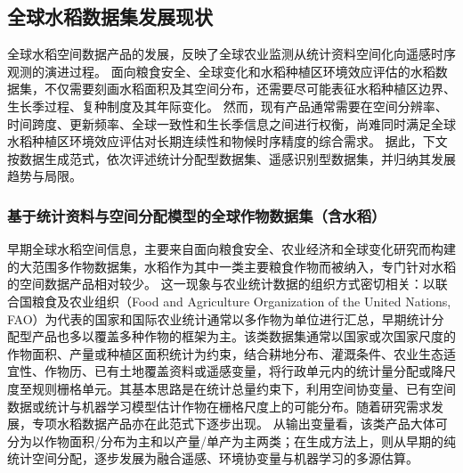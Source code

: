 \subsection{全球水稻数据集发展现状}

全球水稻空间数据产品的发展，反映了全球农业监测从统计资料空间化向遥感时序观测的演进过程。
面向粮食安全、全球变化和水稻种植区环境效应评估的水稻数据集，不仅需要刻画水稻面积及其空间分布，还需要尽可能表征水稻种植区边界、生长季过程、复种制度及其年际变化。
然而，现有产品通常需要在空间分辨率、时间跨度、更新频率、全球一致性和生长季信息之间进行权衡，尚难同时满足全球水稻种植区环境效应评估对长期连续性和物候时序精度的综合需求\cite{Dong2016,Fritz2019,Fang2024Review}。
据此，下文按数据生成范式，依次评述统计分配型数据集、遥感识别型数据集，并归纳其发展趋势与局限。

\subsubsection{基于统计资料与空间分配模型的全球作物数据集（含水稻）}

早期全球水稻空间信息，主要来自面向粮食安全、农业经济和全球变化研究而构建的大范围多作物数据集，水稻作为其中一类主要粮食作物而被纳入，专门针对水稻的空间数据产品相对较少。
这一现象与农业统计数据的组织方式密切相关：以联合国粮食及农业组织（Food and Agriculture Organization of the United Nations, FAO）为代表的国家和国际农业统计通常以多作物为单位进行汇总，早期统计分配型产品也多以覆盖多种作物的框架为主。该类数据集通常以国家或次国家尺度的作物面积、产量或种植区面积统计为约束，结合耕地分布、灌溉条件、农业生态适宜性、作物历、已有土地覆盖资料或遥感变量，将行政单元内的统计量分配或降尺度至规则栅格单元。其基本思路是在统计总量约束下，利用空间协变量、已有空间数据或统计与机器学习模型估计作物在栅格尺度上的可能分布\cite{Leff2004,Monfreda2008CropDistribution,You2014SPAM}。随着研究需求发展，专项水稻数据产品亦在此范式下逐步出现。
从输出变量看，该类产品大体可分为以作物面积/分布为主和以产量/单产为主两类；在生成方法上，则从早期的纯统计空间分配，逐步发展为融合遥感、环境协变量与机器学习的多源估算。

